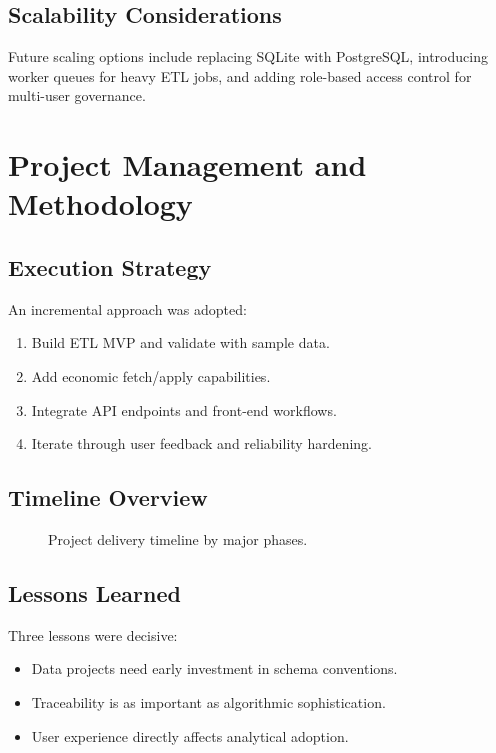 \documentclass[12pt,a4paper]{report}
\begin{document}
\section{Scalability Considerations}
Future scaling options include replacing SQLite with PostgreSQL, introducing worker queues for heavy ETL jobs, and adding role-based access control for multi-user governance.

\chapter{Project Management and Methodology}
\section{Execution Strategy}
An incremental approach was adopted:
\begin{enumerate}[leftmargin=1.5em]
  \item Build ETL MVP and validate with sample data.
  \item Add economic fetch/apply capabilities.
  \item Integrate API endpoints and front-end workflows.
  \item Iterate through user feedback and reliability hardening.
\end{enumerate}

\section{Timeline Overview}
\begin{figure}[H]
\centering
{}
\caption{Project delivery timeline by major phases.}
\end{figure}

\section{Lessons Learned}
Three lessons were decisive:
\begin{itemize}[leftmargin=1.5em]
  \item Data projects need early investment in schema conventions.
  \item Traceability is as important as algorithmic sophistication.
  \item User experience directly affects analytical adoption.
\end{itemize}
\end{document}
